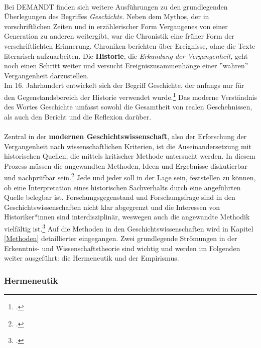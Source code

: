 \documentclass[12pt,a4paper]{article}
\begin{document}
\\
Bei DEMANDT finden sich weitere Ausführungen zu den grundlegenden Überlegungen des Begriffes \textit{Geschichte}. Neben dem Mythos, der in vorschriftlichen Zeiten und in erzählerischer Form Vergangenes von einer Generation zu anderen weitergibt, war die Chronistik eine früher Form der verschriftlichten Erinnerung. Chroniken berichten über Ereignisse, ohne die Texte literarisch aufzuarbeiten. Die \textbf{Historie}, die \textit{Erkundung der Vergangenheit}, geht noch einen Schritt weiter und versucht Ereigniszusammenhänge einer ''wahren'' Vergangenheit darzustellen. 
\\
Im 16. Jahrhundert entwickelt sich der Begriff Geschichte, der anfangs nur für den Gegenstandsbereich der Historie verwendet wurde.\footcite[][S.57-58]{schulz2010neuere} Das moderne Verständnis des Wortes Geschichte umfasst sowohl die Gesamtheit von realen Geschehnissen, als auch den Bericht und die Reflexion darüber.
\\
\\
Zentral in der \textbf{modernen Geschichtswissenschaft}, also der Erforschung der Vergangenheit nach wissenschaftlichen Kriterien, ist die Auseinandersetzung mit historischen Quellen, die mittels kritischer Methode untersucht werden. In diesem Prozess müssen die angewandten Methoden, Ideen und Ergebnisse diskutierbar und nachprüfbar sein.\footcite[][S.13-32]{demand2011philosophie} Jede und jeder soll in der Lage sein, feststellen zu können, ob eine Interpretation eines historischen Sachverhalts durch eine angeführten Quelle belegbar ist. Forschungsgegenstand und Forschungsfrage sind in den Geschichtswissenschaften nicht klar abgegrenzt und die Interessen von Historiker*innen sind interdisziplinär, weswegen auch die angewandte Methodik vielfältig ist.\footcite[][S.13]{reiche2014verfahren} Auf die Methoden in den Geschichtswissenschaften wird in Kapitel \ref{Methoden} detaillierter eingegangen.
Zwei grundlegende Strömungen in der Erkenntnis- und Wissenschaftstheorie sind wichtig und werden im Folgenden weiter ausgeführt: die Hermeneutik und der Empirismus.


\subsubsection{Hermeneutik}
\end{document}
